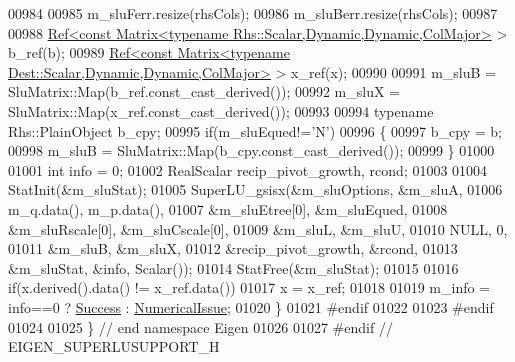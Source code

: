 \begin{DoxyCode}
00984 
00985   m\_sluFerr.resize(rhsCols);
00986   m\_sluBerr.resize(rhsCols);
00987   
00988   \hyperlink{group___core___module_class_eigen_1_1_ref}{Ref<const Matrix<typename Rhs::Scalar,Dynamic,Dynamic,ColMajor>}
       > b\_ref(b);
00989   \hyperlink{group___core___module_class_eigen_1_1_ref}{Ref<const Matrix<typename Dest::Scalar,Dynamic,Dynamic,ColMajor>}
       > x\_ref(x);
00990   
00991   m\_sluB = SluMatrix::Map(b\_ref.const\_cast\_derived());
00992   m\_sluX = SluMatrix::Map(x\_ref.const\_cast\_derived());
00993 
00994   \textcolor{keyword}{typename} Rhs::PlainObject b\_cpy;
00995   \textcolor{keywordflow}{if}(m\_sluEqued!=\textcolor{charliteral}{'N'})
00996   \{
00997     b\_cpy = b;
00998     m\_sluB = SluMatrix::Map(b\_cpy.const\_cast\_derived());  
00999   \}
01000   
01001   \textcolor{keywordtype}{int} info = 0;
01002   RealScalar recip\_pivot\_growth, rcond;
01003 
01004   StatInit(&m\_sluStat);
01005   SuperLU\_gsisx(&m\_sluOptions, &m\_sluA,
01006                 m\_q.data(), m\_p.data(),
01007                 &m\_sluEtree[0], &m\_sluEqued,
01008                 &m\_sluRscale[0], &m\_sluCscale[0],
01009                 &m\_sluL, &m\_sluU,
01010                 NULL, 0,
01011                 &m\_sluB, &m\_sluX,
01012                 &recip\_pivot\_growth, &rcond,
01013                 &m\_sluStat, &info, Scalar());
01014   StatFree(&m\_sluStat);
01015   
01016   \textcolor{keywordflow}{if}(x.derived().data() != x\_ref.data())
01017     x = x\_ref;
01018 
01019   m\_info = info==0 ? \hyperlink{group__enums_gga85fad7b87587764e5cf6b513a9e0ee5ea52581b035f4b59c203b8ff999ef5fcea}{Success} : \hyperlink{group__enums_gga85fad7b87587764e5cf6b513a9e0ee5eaaf9b736d310a664e7729d163a035cc5f}{NumericalIssue};
01020 \}
01021 \textcolor{preprocessor}{#endif}
01022 
01023 \textcolor{preprocessor}{#endif}
01024 
01025 \} \textcolor{comment}{// end namespace Eigen}
01026 
01027 \textcolor{preprocessor}{#endif // EIGEN\_SUPERLUSUPPORT\_H}
\end{DoxyCode}
